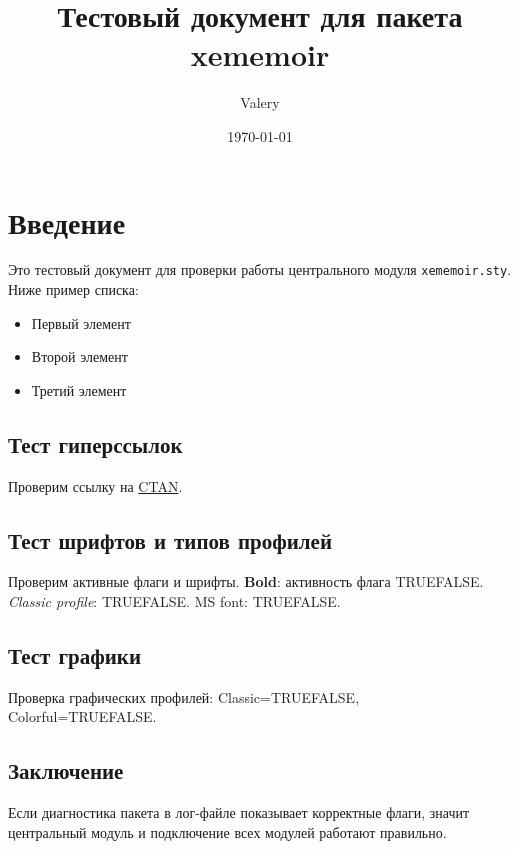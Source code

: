 \documentclass[12pt]{memoir}
\title{Тестовый документ для пакета xememoir}
\author{Valery}
\date{\today}
\begin{document}
	\maketitle


	\chapter{Введение}
	Это тестовый документ для проверки работы центрального модуля \texttt{xememoir.sty}.
	Ниже пример списка:

	\begin{itemize}
		\item Первый элемент
		\item Второй элемент
		\item Третий элемент
	\end{itemize}

	\section{Тест гиперссылок}
	Проверим ссылку на \href{https://www.ctan.org}{CTAN}.

	\section{Тест шрифтов и типов профилей}
	Проверим активные флаги и шрифты.
	\textbf{Bold}: активность флага \if@xem@bold TRUE\else FALSE\fi.
	\textit{Classic profile}: \if@xem@classic TRUE\else FALSE\fi.
	MS font: \if@xem@ms TRUE\else FALSE\fi.

	\section{Тест графики}
	Проверка графических профилей: Classic=\if@xemg@classic TRUE\else FALSE\fi, Colorful=\if@xemg@colorful TRUE\else FALSE\fi.

	\section{Заключение}
	Если диагностика пакета в лог-файле показывает корректные флаги, значит центральный модуль и подключение всех модулей работают правильно.
\end{document}
